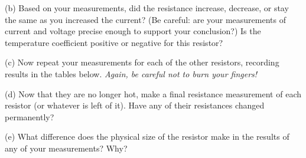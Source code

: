(b)  Based on your measurements, did the resistance increase, decrease, or stay the same as you increased the current?  (Be careful: are your measurements of current and voltage precise enough to support your conclusion?)  Is the temperature coefficient positive or negative for this resistor? 
\vspace{1.0in}

\begin{center}
 \par
\end{center}

(c) Now repeat your measurements for each of the other resistors, recording results in the tables below.  \textit{Again, be careful not to burn your fingers!}

\maketableforivmeasurements

\maketableforivmeasurements

\maketableforivmeasurements


(d) Now that they are no longer hot, make a final resistance measurement of each resistor (or whatever is left of it).  Have any of their resistances changed permanently?
\vspace{1.5in}

(e) What difference does the physical size of the resistor make in the results of any of your measurements?  Why?
\vspace{1.5in}






